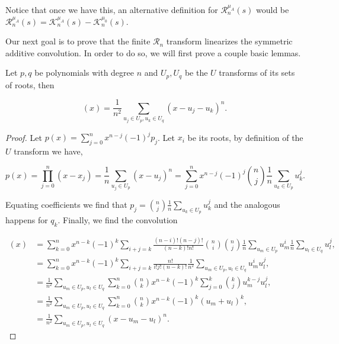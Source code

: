 Notice that once we have this, an alternative definition for $\mathcal R_n^{\mu_A}(s)$ would be $\mathcal R_n^{\mu_A}(s) = \mathcal K_n^{\mu_A}(s) - \mathcal K_n^{\mu_0}(s)$.

Our next goal is to prove that the finite $\mathcal R_n$ transform linearizes the symmetric additive convolution. In order to do so, we will first prove a couple basic lemmas.

\begin{lemma} \label{lemma:Utrans_convolution}
    Let $p,q$ be polynomials with degree $n$ and $U_p,U_q$ be the $U$ transforms of its sets of roots, then

    \begin{equation*}
        [p \boxplus_n q](x) = \frac1{n^2} \sum_{u_j \in U_p, u_k \in U_q} (x - u_j -u_k)^n.
    \end{equation*}
\end{lemma}

\begin{proof}
    Let $p(x) = \sum_{j=0}^n x^{n-j}(-1)^j p_j$. Let $x_i$ be its roots, by definition of the $U$ transform we have,

    \begin{equation*}
        p(x) = \prod_{j=0}^n (x - x_j) = \frac1n \sum_{u_j \in U_p} (x-u_j)^n = \sum_{j=0}^n x^{n-j} (-1)^j \binom{n}{j} \frac{1}{n} \sum_{u_k \in U_p} u_k^j.
    \end{equation*}

    Equating coefficients we find that $p_j = \binom{n}{j} \frac{1}{n} \sum_{u_k \in U_p} u_k^j$ and the analogous happens for $q_k$. Finally, we find the convolution

    \begin{align*}
        [p\boxplus_n q](x) &= \sum_{k=0}^n x^{n-k}(-1)^k \sum_{i+j=k} \frac{(n-i)!(n-j)!}{(n-k)!n!} \binom{n}{i}\binom{n}{j} \frac{1}{n} \sum_{u_m \in U_p} u_m^i \frac{1}{n} \sum_{u_l \in U_q} u_l^j ,\\%
        &= \sum_{k=0}^n x^{n-k}(-1)^k \sum_{i+j=k} \frac{n!}{i!j!(n-k)!} \frac1{n^2}  \sum_{u_m \in U_p, u_l \in U_q} u_m^i u_l^j, \\ %
        &= \frac1{n^2}\sum_{u_m \in U_p, u_l \in U_q}\sum_{k=0}^n \binom nk x^{n-k}(-1)^k \sum_{j=0}^k \binom{k}{j}u_m^{k-j} u_l^j, \\
        &= \frac1{n^2}\sum_{u_m \in U_p, u_l \in U_q} \sum_{k=0}^n \binom nk x^{n-k}(-1)^k (u_m + u_l)^k,\\%
        &= \frac1{n^2}\sum_{u_m \in U_p, u_l \in U_q} (x-u_m-u_l)^n. %
    \end{align*}
\end{proof}







